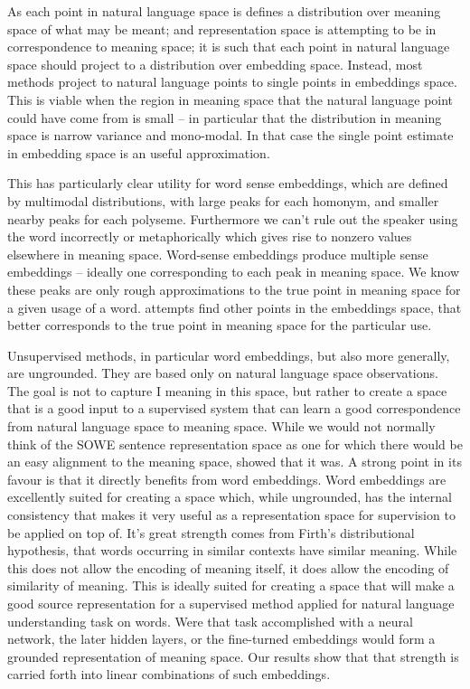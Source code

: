 \documentclass{book}
\begin{document}
As each point in natural language space is defines a distribution over meaning space of what may be meant;
and representation space is attempting to be in correspondence to meaning space;
it is such that each point in natural language space should project to a distribution over embedding space.
Instead, most methods project to natural language points to single points in embeddings space.
This is viable when the region in meaning space that the natural language point could have come from is small -- in particular that the distribution in meaning space is narrow variance and mono-modal.
In that case the single point estimate in embedding space is an useful approximation.


This has particularly clear utility for word sense embeddings,
which are defined by multimodal distributions,
with large peaks for each homonym, and smaller nearby peaks for each polyseme.
Furthermore we can't rule out the speaker using the word incorrectly or metaphorically which gives rise to nonzero values elsewhere in meaning space.
Word-sense embeddings produce multiple sense embeddings -- ideally one corresponding to each peak in meaning space.
We know these peaks are only rough approximations to the true point in meaning space for a given usage of a word.
 attempts find other points in the embeddings space, that better corresponds to the true point in meaning space for the particular use.


Unsupervised methods, in particular word embeddings, but also more generally, are ungrounded.
They are based only on natural language space observations.
The goal is not to capture I meaning in this space,
but rather to create a space that is a good input to a supervised system that can learn a good correspondence from natural language space to meaning space. 
While we would not normally think of the SOWE sentence representation space as one for which there would be an easy alignment to the meaning space,
 showed that it was.
A strong point in its favour is that it directly benefits from word embeddings.
Word embeddings are excellently suited for creating a space which, while ungrounded, has the internal consistency that makes it very useful as a representation space for supervision to be applied on top of.
It's great strength comes from Firth's distributional hypothesis, that words occurring in similar contexts have similar meaning.
While this does not allow the encoding of meaning itself, it does allow the encoding of similarity of meaning.
This is ideally suited for creating a space that will make a good source representation for a supervised method applied for natural language understanding task on words.
Were that task accomplished with a neural network, the later hidden layers, or the fine-turned embeddings would form a grounded representation of meaning space.
Our results show that that strength is carried forth into linear combinations of such embeddings.
\end{document}
